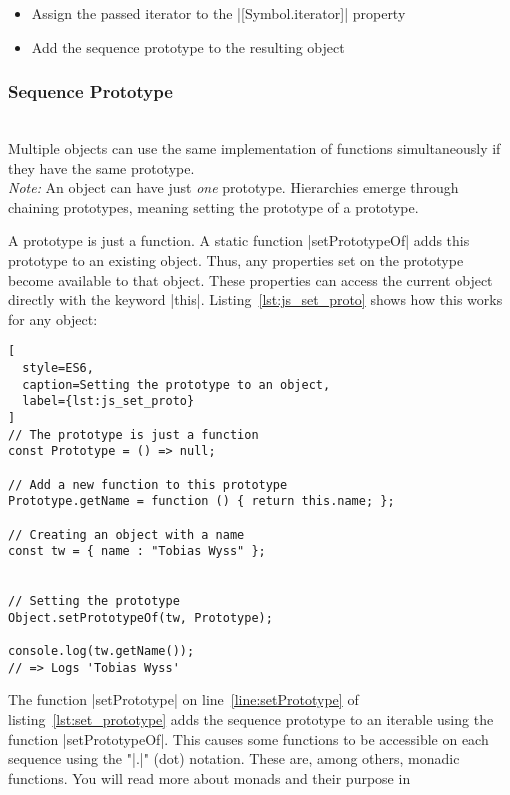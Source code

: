 \begin{itemize}
  \item{Assign the passed iterator to the |[Symbol.iterator]| property}
  \item{Add the sequence prototype to the resulting object}
\end{itemize}


\subsubsection{Sequence Prototype}
\label{subsub:Sequence Prototype}
\\ 
Multiple objects can use the same implementation of functions simultaneously if
they have the same prototype.\\
\textit{Note:} An object can have just \textit{one} prototype. Hierarchies
emerge through chaining prototypes, meaning setting the prototype of a
prototype.

A prototype is just a function. A static function |setPrototypeOf| adds this
prototype to an existing object. Thus, any properties set on the prototype
become available to that object. These properties can access the current object
directly with the keyword |this|. Listing~\ref{lst:js_set_proto} shows how this
works for any object:

\begin{lstlisting}[
  style=ES6,
  caption=Setting the prototype to an object,
  label={lst:js_set_proto}
]
// The prototype is just a function
const Prototype = () => null; 

// Add a new function to this prototype
Prototype.getName = function () { return this.name; };

// Creating an object with a name
const tw = { name : "Tobias Wyss" };


// Setting the prototype
Object.setPrototypeOf(tw, Prototype);

console.log(tw.getName());
// => Logs 'Tobias Wyss' 
\end{lstlisting}


The function |setPrototype| on line~\ref{line:setPrototype} of
listing~\ref{lst:set_prototype} adds the sequence prototype to an iterable
using the function |setPrototypeOf|. This causes some functions to be
accessible on each sequence using the "|.|" (dot) notation. These are, among
others, monadic functions. You will read more about monads and their purpose in

